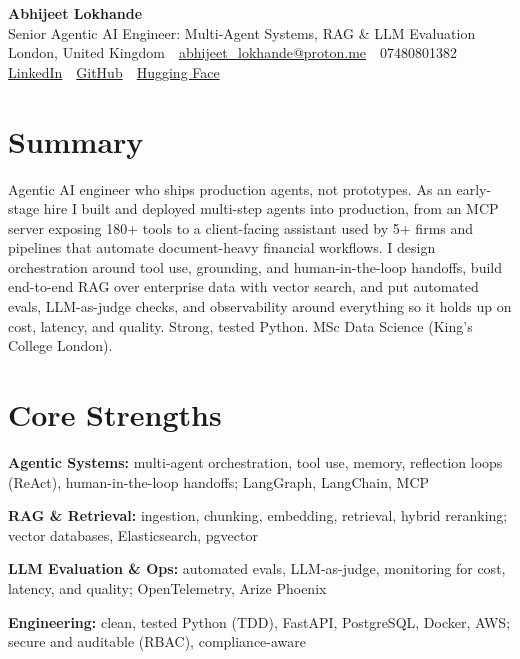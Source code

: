 \documentclass[10pt,a4paper]{article}
\newcommand{\sep}{\,\textcolor{accent!60}{\textbar}\,}
\begin{document}
\begin{center}
  {\fontsize{24}{26}\selectfont\bfseries Abhijeet Lokhande}\\[3pt]
  {\color{accent}\large Senior Agentic AI Engineer: Multi-Agent Systems, RAG \& LLM Evaluation}\\[5pt]
  {\small
    London, United Kingdom \sep
    \href{mailto:abhijeet_lokhande@proton.me}{abhijeet\_lokhande@proton.me} \sep
    07480801382 \\[2pt]
    \href{https://www.linkedin.com/in/ablds/}{LinkedIn} \sep
    \href{https://github.com/abhijeetscode}{GitHub} \sep
    \href{https://huggingface.co/ab-ai}{Hugging Face}
  }
\end{center}
\vspace{2pt}

\section{Summary}
Agentic AI engineer who ships production agents, not prototypes. As an early-stage hire I built and deployed multi-step agents into production, from an MCP server exposing 180+ tools to a client-facing assistant used by 5+ firms and pipelines that automate document-heavy financial workflows. I design orchestration around tool use, grounding, and human-in-the-loop handoffs, build end-to-end RAG over enterprise data with vector search, and put automated evals, LLM-as-judge checks, and observability around everything so it holds up on cost, latency, and quality. Strong, tested Python. MSc Data Science (King's College London).

\section{Core Strengths}
\begin{tight}
  \item[\textcolor{accent}{\small$\bullet$}] \textbf{Agentic Systems:} multi-agent orchestration, tool use, memory, reflection loops (ReAct), human-in-the-loop handoffs; LangGraph, LangChain, MCP
  \item[\textcolor{accent}{\small$\bullet$}] \textbf{RAG \& Retrieval:} ingestion, chunking, embedding, retrieval, hybrid reranking; vector databases, Elasticsearch, pgvector
  \item[\textcolor{accent}{\small$\bullet$}] \textbf{LLM Evaluation \& Ops:} automated evals, LLM-as-judge, monitoring for cost, latency, and quality; OpenTelemetry, Arize Phoenix
  \item[\textcolor{accent}{\small$\bullet$}] \textbf{Engineering:} clean, tested Python (TDD), FastAPI, PostgreSQL, Docker, AWS; secure and auditable (RBAC), compliance-aware
\end{tight}
\end{document}
